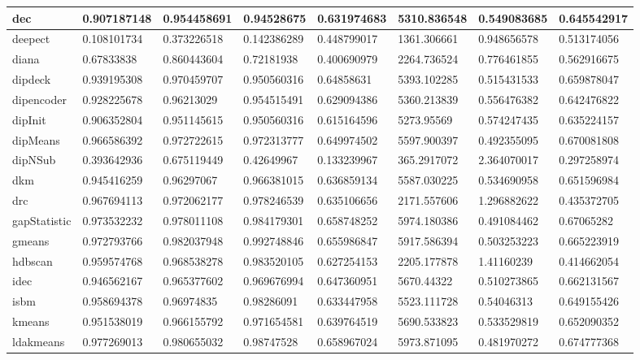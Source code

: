 \begin{table}[H]
\begin{tabular}{|l|l|l|l|l|l|l|l|}
dec & 0.907187148 & 0.954458691 & 0.94528675 & 0.631974683 & 5310.836548 & 0.549083685 & 0.645542917 \\
\hline
deepect & 0.108101734 & 0.373226518 & 0.142386289 & 0.448799017 & 1361.306661 & 0.948656578 & 0.513174056 \\
\hline
diana & 0.67833838 & 0.860443604 & 0.72181938 & 0.400690979 & 2264.736524 & 0.776461855 & 0.562916675 \\
\hline
dipdeck & 0.939195308 & 0.970459707 & 0.950560316 & 0.64858631 & 5393.102285 & 0.515431533 & 0.659878047 \\
\hline
dipencoder & 0.928225678 & 0.96213029 & 0.954515491 & 0.629094386 & 5360.213839 & 0.556476382 & 0.642476822 \\
\hline
dipInit & 0.906352804 & 0.951145615 & 0.950560316 & 0.615164596 & 5273.95569 & 0.574247435 & 0.635224157 \\
\hline
dipMeans & 0.966586392 & 0.972722615 & 0.972313777 & 0.649974502 & 5597.900397 & 0.492355095 & 0.670081808 \\
\hline
dipNSub & 0.393642936 & 0.675119449 & 0.42649967 & 0.133239967 & 365.2917072 & 2.364070017 & 0.297258974 \\
\hline
dkm & 0.945416259 & 0.96297067 & 0.966381015 & 0.636859134 & 5587.030225 & 0.534690958 & 0.651596984 \\
\hline
drc & 0.967694113 & 0.972062177 & 0.978246539 & 0.635106656 & 2171.557606 & 1.296882622 & 0.435372705 \\
\hline
gapStatistic & 0.973532232 & 0.978011108 & 0.984179301 & 0.658748252 & 5974.180386 & 0.491084462 & 0.67065282 \\
\hline
gmeans & 0.972793766 & 0.982037948 & 0.992748846 & 0.655986847 & 5917.586394 & 0.503253223 & 0.665223919 \\
\hline
hdbscan & 0.959574768 & 0.968538278 & 0.983520105 & 0.627254153 & 2205.177878 & 1.41160239 & 0.414662054 \\
\hline
idec & 0.946562167 & 0.965377602 & 0.969676994 & 0.647360951 & 5670.44322 & 0.510273865 & 0.662131567 \\
\hline
isbm & 0.958694378 & 0.96974835 & 0.98286091 & 0.633447958 & 5523.111728 & 0.54046313 & 0.649155426 \\
\hline
kmeans & 0.951538019 & 0.966155792 & 0.971654581 & 0.639764519 & 5690.533823 & 0.533529819 & 0.652090352 \\
\hline
ldakmeans & 0.977269013 & 0.980655032 & 0.98747528 & 0.658967024 & 5973.871095 & 0.481970272 & 0.674777368 \\

\end{tabular}
\end{table}
